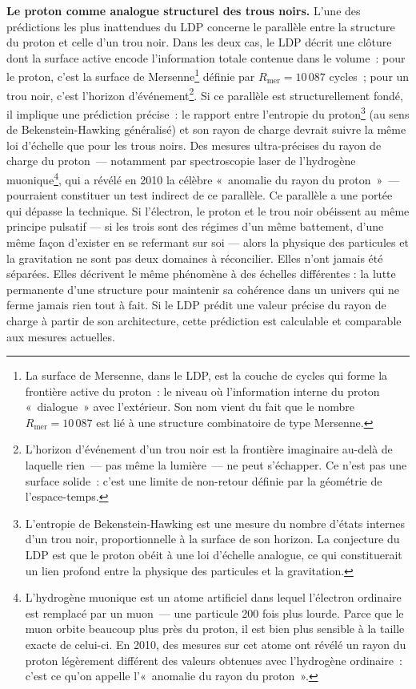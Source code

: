\documentclass[12pt, a4paper, openright]{book}
\begin{document}
\medskip

\textbf{Le proton comme analogue structurel des trous noirs.} L'une des prédictions les plus inattendues du LDP concerne le parallèle entre la structure du proton et celle d'un trou noir. Dans les deux cas, le LDP décrit une clôture dont la surface active encode l'information totale contenue dans le volume~: pour le proton, c'est la surface de Mersenne\footnote{La surface de Mersenne, dans le LDP, est la couche de cycles qui forme la frontière active du proton~: le niveau où l'information interne du proton «~dialogue~» avec l'extérieur. Son nom vient du fait que le nombre $R_\text{mer} = 10\,087$ est lié à une structure combinatoire de type Mersenne.} définie par $R_\text{mer} = 10\,087$ cycles~; pour un trou noir, c'est l'horizon d'événement\footnote{L'horizon d'événement d'un trou noir est la frontière imaginaire au-delà de laquelle rien~--- pas même la lumière~--- ne peut s'échapper. Ce n'est pas une surface solide~: c'est une limite de non-retour définie par la géométrie de l'espace-temps.}. Si ce parallèle est structurellement fondé, il implique une prédiction précise~: le rapport entre l'entropie du proton\footnote{L'entropie de Bekenstein-Hawking est une mesure du nombre d'états internes d'un trou noir, proportionnelle à la surface de son horizon. La conjecture du LDP est que le proton obéit à une loi d'échelle analogue, ce qui constituerait un lien profond entre la physique des particules et la gravitation.} (au sens de Bekenstein-Hawking généralisé) et son rayon de charge devrait suivre la même loi d'échelle que pour les trous noirs. Des mesures ultra-précises du rayon de charge du proton~--- notamment par spectroscopie laser de l'hydrogène muonique\footnote{L'hydrogène muonique est un atome artificiel dans lequel l'électron ordinaire est remplacé par un muon~--- une particule 200 fois plus lourde. Parce que le muon orbite beaucoup plus près du proton, il est bien plus sensible à la taille exacte de celui-ci. En 2010, des mesures sur cet atome ont révélé un rayon du proton légèrement différent des valeurs obtenues avec l'hydrogène ordinaire~: c'est ce qu'on appelle l'«~anomalie du rayon du proton~».}, qui a révélé en 2010 la célèbre «~anomalie du rayon du proton~»~--- pourraient constituer un test indirect de ce parallèle. Ce parallèle a une portée qui dépasse la technique. Si l'électron, le proton et le trou noir obéissent au même principe pulsatif --- si les trois sont des régimes d'un même battement, d'une même façon d'exister en se refermant sur soi --- alors la physique des particules et la gravitation ne sont pas deux domaines à réconcilier. Elles n'ont jamais été séparées. Elles décrivent le même phénomène à des échelles différentes : la lutte permanente d'une structure pour maintenir sa cohérence dans un univers qui ne ferme jamais rien tout à fait. Si le LDP prédit une valeur précise du rayon de charge à partir de son architecture, cette prédiction est calculable et comparable aux mesures actuelles.
\end{document}

